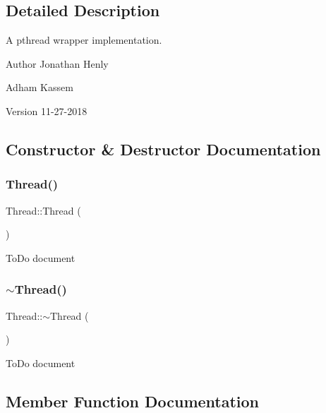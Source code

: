 \subsection{Detailed Description}
A pthread wrapper implementation. 

\begin{DoxyAuthor}{Author}
Jonathan Henly 

Adham Kassem 
\end{DoxyAuthor}
\begin{DoxyVersion}{Version}
11-\/27-\/2018 
\end{DoxyVersion}


\subsection{Constructor \& Destructor Documentation}
\mbox{\label{classThread_a95c703fb8f2f27cb64f475a8c940864a}} 
\subsubsection{\texorpdfstring{Thread()}{Thread()}}
{\footnotesize\ttfamily Thread\+::\+Thread (\begin{DoxyParamCaption}{ }\end{DoxyParamCaption})}

To\+Do document \mbox{\label{classThread_a37d9edd3a1a776cbc27dedff949c9726}} 
\subsubsection{\texorpdfstring{$\sim$\+Thread()}{~Thread()}}
{\footnotesize\ttfamily Thread\+::$\sim$\+Thread (\begin{DoxyParamCaption}{ }\end{DoxyParamCaption})\hspace{0.3cm}{\ttfamily [virtual]}}

To\+Do document 

\subsection{Member Function Documentation}
\mbox{\label{classThread_a2a08036a4598cfc554114fee9d0e8485}} 
